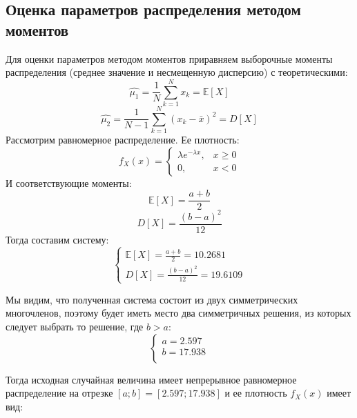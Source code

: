 \documentclass[14pt,a4paper]{scrartcl}
\begin{document}
\subsection{Оценка параметров распределения методом моментов}
Для оценки параметров методом моментов приравняем выборочные моменты распределения (среднее значение и несмещенную дисперсию) с теоретическими:
\begin{equation*}
	\hat{\mu_1} = \frac{1}{N}\sum_{k=1}^{N}x_k = \mathbb{E}[X]
\end{equation*}
\begin{equation*}
	\hat{\mu_2} = \frac{1}{N-1}\sum_{k=1}^{N}(x_k-\bar{x})^2 = D[X]
\end{equation*}
Рассмотрим равномерное распределение. Ее плотность:
\begin{equation*}
	f_{X}(x)=\left\{\begin{array}{ll}{\lambda e^{-\lambda x},} & {x \geq 0} \\ {0,} & {x<0}\end{array}\right.
\end{equation*}
И соответствующие моменты:
\begin{equation*}
	\mathbb{E}[X] = \frac{a+b}{2}
\end{equation*}
\begin{equation*}
	D[X] = \frac{(b-a)^2}{12}
\end{equation*}
Тогда составим систему: \\
\begin{equation*}
	\begin{cases*}
		\mathbb{E}[X] = \frac{a+b}{2} = 10.2681 \\
		D[X] = \frac{(b-a)^2}{12} = 19.6109
	\end{cases*}
\end{equation*}

Мы видим, что полученная система состоит из двух симметрических многочленов, поэтому будет иметь место два симметричных решения, из которых следует выбрать то решение, где $b > a$: \\
\begin{equation*}
	\begin{cases*}
		a=2.597 \\
		b=17.938 \\
	\end{cases*}
\end{equation*}

Тогда исходная случайная величина имеет непрерывное равномерное распределение на отрезке $[a;b] = [2.597; 17.938]$ и ее плотность $f_X(x)$ имеет вид:
\end{document}
